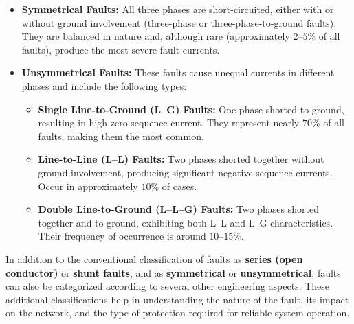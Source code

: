 \begin{itemize}
\item \textbf{Symmetrical Faults:} All three phases are short-circuited, either with or without ground involvement (three-phase or three-phase-to-ground faults).
They are balanced in nature and, although rare (approximately $2$--$5$\% of all faults), produce the most severe fault currents.

\item \textbf{Unsymmetrical Faults:} These faults cause unequal currents in different phases and include the following types:
\begin{itemize}
\item \textbf{Single Line-to-Ground (L--G) Faults:} One phase shorted to ground, resulting in high zero-sequence current.
They represent nearly $70$\% of all faults, making them the most common.
\item \textbf{Line-to-Line (L--L) Faults:} Two phases shorted together without ground involvement, producing significant negative-sequence currents.
Occur in approximately $10$\% of cases.
\item \textbf{Double Line-to-Ground (L--L--G) Faults:} Two phases shorted together and to ground, exhibiting both L--L and L--G characteristics.
Their frequency of occurrence is around $10$--$15$\%.
\end{itemize}
\end{itemize}

In addition to the conventional classification of faults as \textbf{series (open conductor)} or \textbf{shunt faults}, and as \textbf{symmetrical} or \textbf{unsymmetrical}, faults can also be categorized according to several other engineering aspects.
These additional classifications help in understanding the nature of the fault, its impact on the network, and the type of protection required for reliable system operation.


